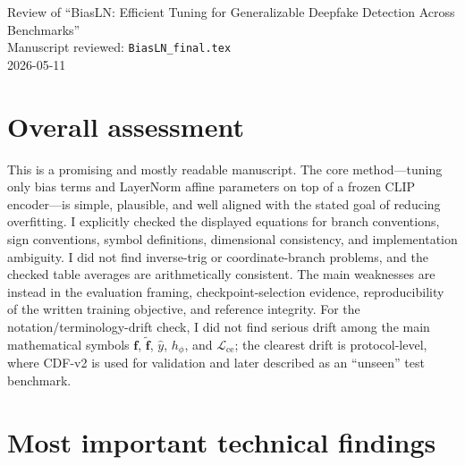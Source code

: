\documentclass[11pt]{article}
\begin{document}
\begin{center}
{\LARGE Review of ``BiasLN: Efficient Tuning for Generalizable Deepfake Detection Across Benchmarks''}\\[0.5em]
{\large Manuscript reviewed: \texttt{BiasLN\_final.tex}}\\[0.25em]
2026-05-11
\end{center}

\section*{Overall assessment}
This is a promising and mostly readable manuscript. The core method---tuning only bias terms and LayerNorm affine parameters on top of a frozen CLIP encoder---is simple, plausible, and well aligned with the stated goal of reducing overfitting. I explicitly checked the displayed equations for branch conventions, sign conventions, symbol definitions, dimensional consistency, and implementation ambiguity. I did not find inverse-trig or coordinate-branch problems, and the checked table averages are arithmetically consistent. The main weaknesses are instead in the evaluation framing, checkpoint-selection evidence, reproducibility of the written training objective, and reference integrity. For the notation/terminology-drift check, I did not find serious drift among the main mathematical symbols $\mathbf{f}$, $\tilde{\mathbf{f}}$, $\hat{y}$, $h_{\phi}$, and $\mathcal{L}_{\text{ce}}$; the clearest drift is protocol-level, where CDF-v2 is used for validation and later described as an ``unseen'' test benchmark.

\section*{Most important technical findings}
\end{document}
